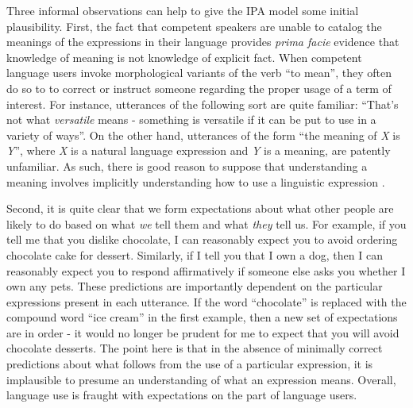 Three informal observations can help to give the IPA model some initial plausibility. First, the fact that competent speakers are unable to catalog the meanings of the expressions in their language provides \textit{prima facie} evidence that knowledge of meaning is not knowledge of explicit fact. When competent language users invoke morphological variants of the verb ``to mean'', they often do so to to correct or instruct someone regarding the proper usage of a term of interest. For instance, utterances of the following sort are quite familiar: ``That's not what \textit{versatile} means - something is versatile if it can be put to use in a variety of ways''. On the other hand, utterances of the form ``the meaning of \textit{X} is \textit{Y}'', where \textit{X} is a natural language expression and \textit{Y} is a meaning, are patently unfamiliar. As such, there is good reason to suppose that understanding a meaning involves implicitly understanding how to use a linguistic expression \citep{Brandom:1994,Horwich:2005}.

Second, it is quite clear that we form expectations about what other people are likely to do based on what \textit{we} tell them and what \textit{they} tell us. For example, if you tell me that you dislike chocolate, I can reasonably expect you to avoid ordering chocolate cake for dessert. Similarly, if I tell you that I own a dog, then I can reasonably expect you to respond affirmatively if someone else asks you whether I own any pets. These predictions are importantly dependent on the particular expressions present in each utterance. If the word ``chocolate'' is replaced with the compound word ``ice cream'' in the first example, then a new set of expectations are in order - it would no longer be prudent for me to expect that you will avoid chocolate desserts. The point here is that in the absence of minimally correct predictions about what follows from the use of a particular expression, it is implausible to presume an understanding of what an expression means. Overall, language use is fraught with expectations on the part of language users.
 
